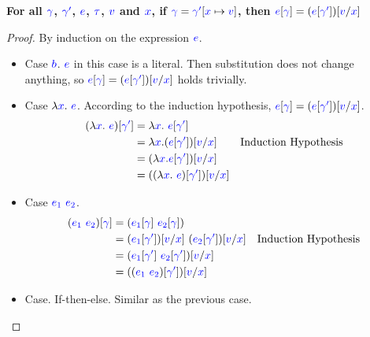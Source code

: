 \documentclass{article}
\newcommand{\meta}[1]{{\color{blue}#1}}
\begin{document}
\begin{enumerate}[resume*]
\begin{enumerate}[(a)]
    \textbf{For all $\meta{\gamma}$, $\meta{\gamma^\prime}$, $\meta{e}$, $\meta{\tau}$, $\meta{v}$ and $\meta{x}$, if $\meta{\gamma}=\meta{\gamma^\prime}[\meta{x}\mapsto \meta{v}]$, then $\meta{e}[\meta{\gamma}]=(\meta{e}[\meta{\gamma^\prime}])[\meta{v}/\meta{x}]$}
    \begin{proof}
      By induction on the expression $\meta{e}$.
      \begin{itemize}
        \item Case $\meta{b}$. $\meta{e}$ in this case is a literal. Then substitution does not change anything, so $\meta{e}[\meta{\gamma}]=(\meta{e}[\meta{\gamma^\prime}])[\meta{v}/\meta{x}]$ holds trivially.
        \item Case $\lambda \meta{x}.\ \meta{e}$. According to the induction hypothesis, $\meta{e}[\meta{\gamma}]=(\meta{e}[\meta{\gamma^\prime}])[\meta{v}/\meta{x}]$. 
          \begin{align*}
            (\lambda \meta{x}.\ \meta{e})[\meta{\gamma^\prime}] &= \lambda \meta{x}.\ \meta{e}[\meta{\gamma^\prime}] \\
            &= \lambda \meta{x}. (\meta{e}[\meta{\gamma^\prime}])[\meta{v}/\meta{x}] & \text{Induction Hypothesis}\\
            &= (\lambda \meta{x}.\meta{e}[\meta{\gamma^\prime}])[\meta{v}/\meta{x}] \\
            &= ((\lambda \meta{x}.\ \meta{e})[\meta{\gamma^\prime}])[\meta{v}/\meta{x}]
          \end{align*}
        \item Case $\meta{e_1}\ \meta{e_2}$.
          \begin{align*}
            (\meta{e_1}\ \meta{e_2})[\meta{\meta{\gamma}}] &= (\meta{e_1}[\meta{\gamma}]\ \meta{e_2}[\meta{\gamma}]) \\
            &= (\meta{e_1}[\meta{\gamma^\prime}])[\meta{v}/\meta{x}]\ (\meta{e_2}[\meta{\gamma^\prime}])[\meta{v}/\meta{x}] & \text{Induction Hypothesis} \\
            &= (\meta{e_1}[\meta{\gamma^\prime}]\ \meta{e_2}[\meta{\gamma^\prime}])[\meta{v}/\meta{x}] \\
            &= ((\meta{e_1}\ \meta{e_2})[\meta{\gamma^\prime}])[\meta{v}/\meta{x}]
          \end{align*}
        \item Case. If-then-else. Similar as the previous case.
      \end{itemize}
    \end{proof}


\end{enumerate}
\end{enumerate}
\end{document}
